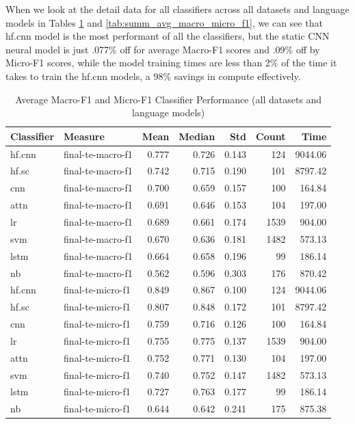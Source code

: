 \documentclass[final]{clv2025}
\begin{document}
When we look at the detail data for all classifiers across all datasets and language models in Tables \ref{tab:avg_macro_micro_f1} and \ref{tab:summ_avg_macro_micro_f1}, we can see that hf.cnn model is the most performant of all the classifiers, but the static CNN neural model is just .077\% off for average Macro-F1 scores and .09\% off by Micro-F1 scores, while the model training times are less than 2\% of the time it takes to train the hf.cnn models, a 98\% savings in compute effectively.

\begin{table}[h!]
\centering
\scriptsize
\caption{Average Macro-F1 and Micro-F1 Classifier Performance (all datasets and language models)}
\label{tab:avg_macro_micro_f1}
\begin{tabular}{@{}p{1.2cm}p{2.3cm}rrrrr@{}}
\toprule
\textbf{Classifier} & \textbf{Measure} & \textbf{Mean} & \textbf{Median} & \textbf{Std} & \textbf{Count} & \textbf{Time} \\
\midrule
hf.cnn & final-te-macro-f1 & 0.777 & 0.726 & 0.143 & 124 & 9044.06 \\
hf.sc  & final-te-macro-f1 & 0.742 & 0.715 & 0.190 & 101 & 8797.42 \\
cnn    & final-te-macro-f1 & 0.700 & 0.659 & 0.157 & 100 & 164.84 \\
attn   & final-te-macro-f1 & 0.691 & 0.646 & 0.153 & 104 & 197.00 \\
lr     & final-te-macro-f1 & 0.689 & 0.661 & 0.174 & 1539 & 904.00 \\
svm    & final-te-macro-f1 & 0.670 & 0.636 & 0.181 & 1482 & 573.13 \\
lstm   & final-te-macro-f1 & 0.664 & 0.658 & 0.196 & 99 & 186.14 \\
nb     & final-te-macro-f1 & 0.562 & 0.596 & 0.303 & 176 & 870.42 \\
\midrule
hf.cnn & final-te-micro-f1 & 0.849 & 0.867 & 0.100 & 124 & 9044.06 \\
hf.sc  & final-te-micro-f1 & 0.807 & 0.848 & 0.172 & 101 & 8797.42 \\
cnn    & final-te-micro-f1 & 0.759 & 0.716 & 0.126 & 100 & 164.84 \\
lr     & final-te-micro-f1 & 0.755 & 0.775 & 0.137 & 1539 & 904.00 \\
attn   & final-te-micro-f1 & 0.752 & 0.771 & 0.130 & 104 & 197.00 \\
svm    & final-te-micro-f1 & 0.740 & 0.752 & 0.147 & 1482 & 573.13 \\
lstm   & final-te-micro-f1 & 0.727 & 0.763 & 0.177 & 99 & 186.14 \\
nb     & final-te-micro-f1 & 0.644 & 0.642 & 0.241 & 175 & 875.38 \\
\bottomrule
\end{tabular}
\end{table}
\end{document}
